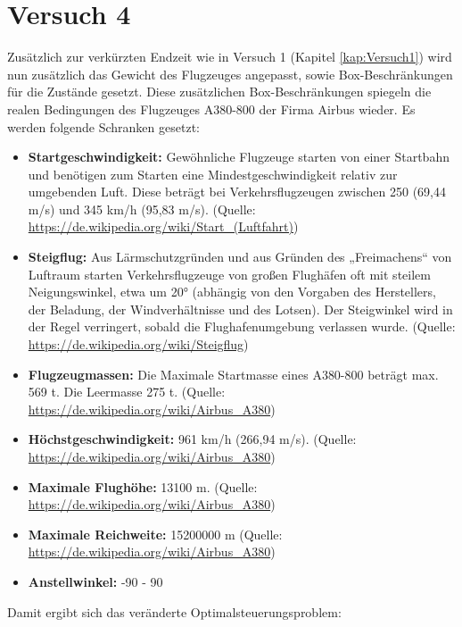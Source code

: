 \section{Versuch 4}
Zusätzlich zur verkürzten Endzeit wie in Versuch 1 (Kapitel \ref{kap:Versuch1}) wird nun zusätzlich das Gewicht des Flugzeuges angepasst, sowie Box-Beschränkungen für die Zustände gesetzt. Diese zusätzlichen Box-Beschränkungen spiegeln die realen Bedingungen des Flugzeuges A380-800 der Firma Airbus wieder. Es werden folgende Schranken gesetzt:
\begin{itemize}
\item \textbf{Startgeschwindigkeit:} Gewöhnliche Flugzeuge starten von einer Startbahn und benötigen zum Starten eine Mindestgeschwindigkeit relativ zur umgebenden Luft. Diese beträgt bei Verkehrsflugzeugen zwischen 250 (69,44 m/s) und 345 km/h (95,83 m/s). (Quelle: \url{https://de.wikipedia.org/wiki/Start_(Luftfahrt)})
%
\item \textbf{Steigflug:} Aus Lärmschutzgründen und aus Gründen des „Freimachens“ von Luftraum starten Verkehrsflugzeuge von großen Flughäfen oft mit steilem Neigungswinkel, etwa um 20° (abhängig von den Vorgaben des Herstellers, der Beladung, der Windverhältnisse und des Lotsen). Der Steigwinkel wird in der Regel verringert, sobald die Flughafenumgebung verlassen wurde. (Quelle: \url{https://de.wikipedia.org/wiki/Steigflug})
%
\item \textbf{Flugzeugmassen:} Die Maximale Startmasse eines A380-800 beträgt max. 569 t. Die Leermasse 275 t. (Quelle: \url{https://de.wikipedia.org/wiki/Airbus_A380})
%
\item \textbf{Höchstgeschwindigkeit:} 961 km/h (266,94 m/s). (Quelle: \url{https://de.wikipedia.org/wiki/Airbus_A380})
%
\item \textbf{Maximale Flughöhe:} 13100 m. (Quelle: \url{https://de.wikipedia.org/wiki/Airbus_A380})
%
\item \textbf{Maximale Reichweite:} 15200000 m (Quelle: \url{https://de.wikipedia.org/wiki/Airbus_A380})
%
\item \textbf{Anstellwinkel:} -90 - 90
\end{itemize}
Damit ergibt sich das veränderte Optimalsteuerungsproblem:
